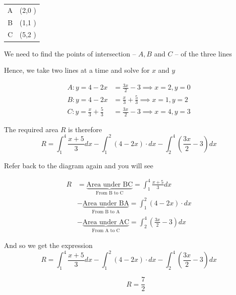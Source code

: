 \documentclass[14pt,fleqn]{extarticle}
\begin{document}
\begin{center}
  \begin{tabular}{NN}
  \toprule 
        &  \\
   \midrule
   A & \left(2,0 \right) \\
   \midrule
   B & \left(1,1 \right)\\
    \midrule 
    C & \left(5,2 \right) \\
    \bottomrule
  \end{tabular}
\end{center}
\newcard 

We need to find the points of intersection -- $A,B$ and $C$ -- of the three lines \newline 

 Hence, we take two lines at a time and solve for $x$ and $y$ 

\begin{align}
A: y=4-2x &= \frac{3x}{2}-3\implies x = 2, y = 0 \\
B: y=4-2x &= \frac{x}{3}+\frac{5}{3} \implies x = 1, y = 2 \\
C: y = \frac{x}{3}+\frac{5}{3} &= \frac{3x}{2}-3 \implies x = 4,y=3 
\end{align}

\newcard 

The required area $R$ is therefore 
\small\[R = \int_1^4 \frac{x+5}{3}dx - \int_1^2 (4-2x)\cdot dx - \int_2^4 \left( \frac{3x}{2}-3\right)dx\]\normalsize 

\newcard 

Refer back to the diagram again and you will see 

\begin{align}
R &= \underbrace{\text{Area under BC}}_{\text{From B to C}} = \int_1^4 \frac{x+5}{3}dx\\
&- \underbrace{\text{Area under BA}}_{\text{From B to A}}=\int_1^2 (4-2x)\cdot dx \\ 
&- \underbrace{\text{Area under AC}}_{\text{From A to C}}=\int_2^4 \left( \frac{3x}{2}-3\right)dx
\end{align}\newline 

And so we get the expression 
\small\[R = \int_1^4 \frac{x+5}{3}dx - \int_1^2 (4-2x)\cdot dx - \int_2^4 \left( \frac{3x}{2}-3\right)dx\]\normalsize 

\newcard 

\[ \qquad R = \frac{7}{2}\]

\newcard 
\end{document}
